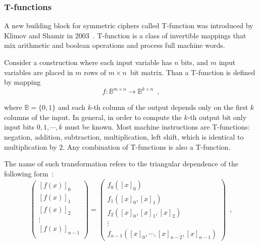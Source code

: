 \subsubsection{T-functions}

A new building block for symmetric ciphers called T-function was introduced by
Klimov and Shamir in 2003~\cite{klimov:tfunc}. T-function is a class of
invertible mappings that mix arithmetic and boolean operations and process
full machine words.

Consider a construction where each input variable has $n$ bits, and $m$ input
variables are placed in $m$ rows of \mbox{$m \times n$ bit} matrix. Than a
T-function is defined by mapping
\begin{equation}
    \label{eqn:t-func}
    f: \mathbb{B}^{m \times n} \rightarrow \mathbb{B}^{k \times n} \enspace,
\end{equation}%

where $\mathbb{B} = \{0, 1\}$ and each $k$-th column of the output depends only on
the first $k$ columns of the input. In general, in order to compute the $k$-th
output bit only input bits $0, 1, \cdots, k$ must be known. Most machine
instructions are T-functions: negation, addition, subtraction, multiplication, left
shift, which is identical to multiplication by $2$. Any combination of
T-functions is also a T-function.

The name of such transformation refers to the triangular dependence of the following
form~\cite{dblp:conf/fse/klimovs05}:
\begin{equation}
    \left(
    \begin{array}{c}
        \left[ f(x) \right]_0 \\
        \left[ f(x) \right]_1 \\
        \left[ f(x) \right]_2 \\
        \vdots \\
        \left[ f(x) \right]_{n-1} \\
    \end{array} \right)%
    = \left(
    \begin{array}{c}
        f_0([x]_0) \\
        f_1([x]_0, [x]_1) \\
        f_2([x]_0, [x]_1, [x]_2) \\
        \vdots \\
        f_{n-1}([x]_0, \cdots, [x]_{n-2}, [x]_{n-1})
    \end{array} \right) \enspace,
\end{equation}

